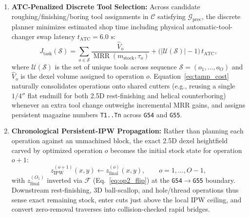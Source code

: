 \documentclass[conference]{IEEEtran}
\begin{document}
\begin{enumerate}
  \item \textbf{ATC-Penalized Discrete Tool Selection:} Across candidate roughing/finishing/boring tool assignments in $\mathcal{C}$ satisfying $\mathcal{G}_{\text{prec}}$, the discrete planner minimizes estimated shop time including physical automatic-tool-changer swap latency $t_{\text{ATC}} = 6.0\text{ s}$:
  \begin{equation}
    J_{\text{task}}(\mathcal{S}) = \sum_{o \in \mathcal{S}} \frac{\widehat{V}_o}{\operatorname{MRR}(m_{\text{stock}}, \tau_o)} + \big(|\mathcal{U}(\mathcal{S})| - 1\big)\,t_{\text{ATC}},
    \label{eq:tamp_cost}
  \end{equation}
  where $\mathcal{U}(\mathcal{S})$ is the set of unique tools across sequence $\mathcal{S} = (o_1,\dots,o_O)$ and $\widehat{V}_o$ is the dexel volume assigned to operation $o$. Equation~\eqref{eq:tamp_cost} naturally consolidates operations onto shared cutters (e.g., reusing a single $1/4''$ flat endmill for both 2.5D rest-finishing and helical counterboring) whenever an extra tool change outweighs incremental MRR gains, and assigns persistent magazine numbers \texttt{T1..Tn} across \texttt{G54} and \texttt{G55}.
  \item \textbf{Chronological Persistent-IPW Propagation:} Rather than planning each operation against an unmachined block, the exact 2.5D dexel heightfield carved by optimized operation $o$ becomes the initial stock state for operation $o+1$:
  \begin{equation}
    z_{\text{IPW}}^{(o+1)}(x, y) \leftarrow z_{\text{final}}^{(o)}(x, y), \qquad o = 1, \dots, O - 1,
    \label{eq:ipw_update}
  \end{equation}
  with $z_{\text{final}}^{(O_1)}$ inverted via $\mathcal{F}$ (Eq.~\eqref{eq:op2_flip}) at the \texttt{G54}$\to$\texttt{G55} boundary. Downstream rest-finishing, 3D ball-scallop, and hole/thread operations thus sense exact remaining stock, enter cuts just above the local IPW ceiling, and convert zero-removal traverses into collision-checked rapid bridges.
\end{enumerate}
\end{document}
